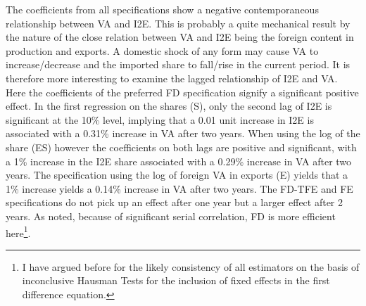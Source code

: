 \documentclass[a4paper]{article}
\begin{document}
The coefficients from all specifications show a negative contemporaneous relationship between VA and I2E. This is probably a quite mechanical result by the nature of the close relation between VA and I2E being the foreign content in production and exports. A domestic shock of any form may cause VA to increase/decrease and the imported share to fall/rise in the current period. It is therefore more interesting to examine the lagged relationship of I2E and VA. Here the coefficients of the preferred FD specification signify a significant positive effect. In the first regression on the shares (S), only the second lag of I2E is significant at the 10\% level, implying that a 0.01 unit increase in I2E is associated with a 0.31\% increase in VA after two years. When using the log of the share (ES) however the coefficients on both lags are positive and significant, with a 1\% increase in the I2E share associated with a  0.29\% increase in VA after two years. The specification using the log of foreign VA in exports (E) yields that a 1\% increase yields a 0.14\% increase in VA after two years. The FD-TFE and FE specifications do not pick up an effect after one year but a larger effect after 2 years. As noted, because of significant serial correlation, FD is more efficient here\footnote{I have argued before for the likely consistency of all estimators on the basis of inconclusive Hausman Tests for the inclusion of fixed effects in the first difference equation.}.    %
\end{document}
